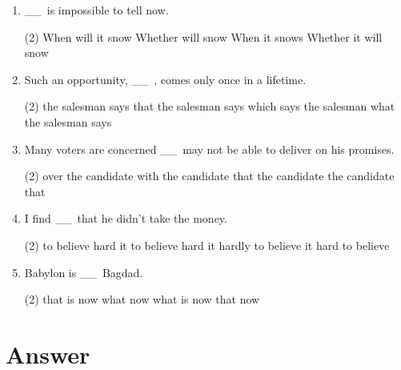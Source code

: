 \documentclass{yufa}
\newcommand\ttu{ \_\_\ }
\begin{document}
\begin{enumerate}
\item \ttu is impossible to tell now.
\begin{tasks}(2)
  \task When will it snow
  \task Whether will snow
  \task When it snows
  \task Whether it will snow
\end{tasks}

\item Such an opportunity, \ttu, comes only once in a lifetime.
\begin{tasks}(2)
  \task the salesman says
  \task that the salesman says
  \task which says the salesman
  \task what the salesman says
\end{tasks}

\item Many voters are concerned \ttu may not be able to deliver on his promises.
\begin{tasks}(2)
  \task over the candidate
  \task with the candidate
  \task that the candidate
  \task the candidate that
\end{tasks}

\item I find \ttu that he didn't take the money.
\begin{tasks}(2)
  \task to believe hard
  \task it to believe hard
  \task it hardly to believe
  \task it hard to believe
\end{tasks}

\item Babylon is \ttu Bagdad.
\begin{tasks}(2)
  \task that is now
  \task what now
  \task what is now
  \task that now
\end{tasks}

\end{enumerate}

\section{Answer}
\end{document}
